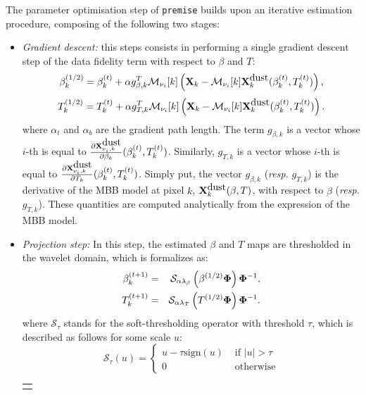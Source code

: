 \documentclass[a4paper,fleqn,usenatbib]{mnras}
\begin{document}
The parameter optimisation step of {\texttt{premise}} builds upon an iterative estimation procedure, composing of the following two stages:
\begin{itemize}
\item{\it Gradient descent: } this steps consists in performing a single gradient descent step of the data fidelity term with respect to $\beta$ and $T$:
\begin{eqnarray}
\beta_k^{(1/2)}  =  \beta_k^{(t)} + \alpha g_{\beta,k}^T {\bf \mathcal{M}}_{\nu_i}[k]  \left({\bf X}_k - {\bf \mathcal{M}}_{\nu_i}[k] {\bf X}_{k}^{\mbox{dust}}(\beta_k^{(t)},T_k^{(t)})  \right),
\end{eqnarray}
\begin{eqnarray}
T_k^{(1/2)} =  T_k^{(t)} + \alpha g_{T,k}^T {\bf \mathcal{M}}_{\nu_i}[k] \left({\bf X}_k - {\bf \mathcal{M}}_{\nu_i}[k]{\bf X}_{k}^{\mbox{dust}}(\beta_k^{(t)},T_k^{(t)})  \right).
\end{eqnarray}
where  $\alpha_t$ and $\alpha_b$ are the gradient path length. The term $g_{\beta,k}$ is a vector whose $i$-th is equal to $\frac{\partial  {\bf X}_{\nu_i,k}^{\mbox{dust}}}{\partial \beta_k}(\beta_k^{(t)},T_k^{(t)})  $. Similarly, $g_{T,k}$ is a vector whose $i$-th is equal to $\frac{\partial  {\bf X}_{\nu_i,k}^{\mbox{dust}}}{\partial T_k}(\beta_k^{(t)},T_k^{(t)})$. Simply put, the vector $g_{\beta,k}$ ({\it resp.} $g_{T,k}$) is the derivative of the MBB model at pixel $k$, ${\bf X}_{k}^{\mbox{dust}}(\beta,T)$, with respect to $\beta$ ({\it resp.} $g_{T,k}$). These quantities are computed analytically from the expression of the MBB model.\\

\item{\it Projection step: } In this step, the estimated $\beta$ and $T$ maps are thresholded in the wavelet domain, which is formalizes as:
\begin{eqnarray}
\beta_k^{(t + 1)} & = & \mathcal{S}_{\alpha \lambda_{\beta}}\left( \beta^{(1/2)} {\bf \Phi} \right) {\bf \Phi}^{-1}, \\
T_k^{(t + 1)} & = & \mathcal{S}_{\alpha \lambda_{T}}\left( T^{(1/2)} {\bf \Phi} \right) {\bf \Phi}^{-1}.
\end{eqnarray}
where $\mathcal{S}_{\tau}$ stands for the soft-thresholding operator with threshold $\tau$, which is described as follows for some scale $u$:
\begin{equation}
\mathcal{S}_{\tau}(u) = \left \{
\begin{array}{ll}
u - \tau \mbox{sign}(u) & \mbox{ if } |u| > \tau \\
0 & \mbox{ otherwise}
\end{array}
\right.
\end{equation}
\begin{center}
	\centering
	\vspace{0.25in}
	\begin{tabular}{|c|} \hline
		\begin{minipage}[hbt]{0.95\linewidth}
			\vspace{0.15in}
			

\end{minipage}
\end{tabular}
\end{center}
\end{itemize}
\end{document}
